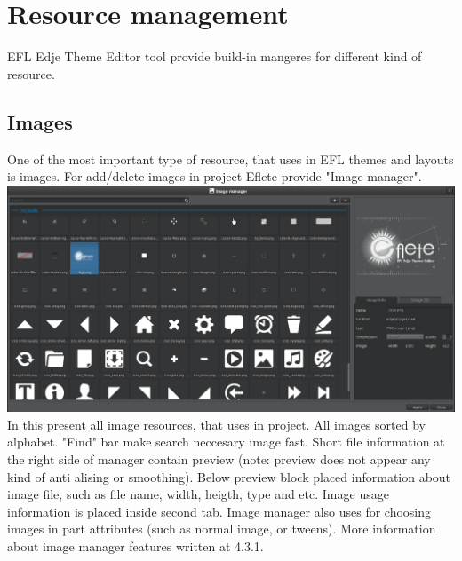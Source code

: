 \documentclass[titlepage,oneside,11pt]{book}
\begin{document}
\section{Resource management}
EFL Edje Theme Editor tool provide build-in mangeres for different kind of resource.
\subsection{Images}
One of the most important type of resource, that uses in EFL themes and layouts is images. \newline
For add/delete images in project Eflete provide "{}Image manager"{}.\newline
\includegraphics[scale=0.3]{images/image_manager_main.png}\newline
In this present all image resources, that uses in project. All images sorted by alphabet. "{}Find"{} bar make search neccesary image fast. Short file information at the right side of manager contain preview (note: preview does not appear any kind of anti alising or smoothing).\newline
\newline Below preview block placed information about image file, such as file name, width, heigth, type and etc. Image usage information is placed inside second tab.\newline
\newline
Image manager also uses for choosing images in part attributes (such as normal image, or tweens).
More information about image manager features written at 4.3.1.
\end{document}
